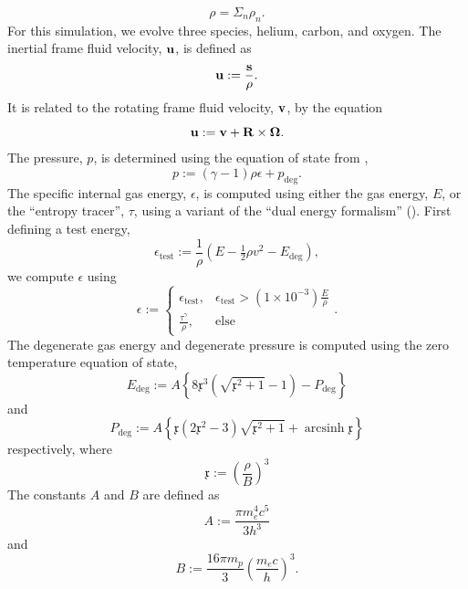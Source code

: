 \documentclass[preprint]{aastex}
\DeclareMathOperator{\arcsinh}{arcsinh}
\begin{document}
\begin{equation}
\rho = \Sigma_n \rho_n.
\end{equation} 
For this simulation, we evolve three species, helium, carbon, and oxygen.
The inertial frame
fluid velocity, ${\bf{u}}$, is defined as 
\begin{equation}
{\bf{u}} := \frac{{\bf{s}}}{\rho}.
\end{equation}
It is related to the rotating frame fluid velocity, ${\bf{v}}$, by the equation
\begin{equation}
{\bf{u}} := {\bf{v}} +  {\bf{R}} \times {\bf{\Omega}}.
\end{equation}
The pressure, $p$, is determined using the equation of state from \cite{SCM1997}, 
\begin{equation}
p := \left( \gamma - 1\right) \rho \epsilon + p_{\mathrm{deg}}.
\end{equation}
The specific internal gas energy, $\epsilon$, is computed using either the gas energy, $E$, or the ``entropy tracer'', $\tau$, using a variant of the ``dual energy formalism'' (\cite{BNSO1995}). 
First defining a test energy,
\begin{equation}
\epsilon_\mathrm{test} := \frac{1}{\rho}\left( E - \tfrac{1}{2} \rho v^2 - E_\mathrm{deg}  \right), 
\end{equation}
we compute $\epsilon$ using
\begin{equation}
\epsilon :=
\begin{cases}
      \epsilon_\mathrm{test}, & \epsilon_\mathrm{test} > \left ( 1 \times 10^{-3} \right ) \frac{E}{\rho} \\
      \frac{\tau^\gamma}{\rho}, & \text{else}
    \end{cases}.
\end{equation}
The degenerate gas energy and degenerate pressure is computed using the zero temperature equation of state, 
\begin{equation}
E_\mathrm{deg} := A \left \{ 
8 \mathfrak{x}^3 \left ( \sqrt{\mathfrak{x}^2 + 1} - 1 \right )  - P_\mathrm{deg} \right \}
\end{equation}
and
\begin{equation}
P_\mathrm{deg} := A \left \{ 
\mathfrak{x} \left ( 2 \mathfrak{x}^2 - 3 \right ) \sqrt{\mathfrak{x}^2 + 1} + \arcsinh{\mathfrak{x}} \right \}
\end{equation}
respectively, where 
\begin{equation}
\mathfrak{x} := \left( \frac{\rho}{B} \right)^3
\end{equation}
The constants $A$ and $B$ are defined as 
\begin{equation}
A := \frac{\pi m_e^4 c^5}{ 3 h^3 }
\end{equation}
and
\begin{equation}
B := \frac{16 \pi m_p}{ 3 } \left(\frac{m_e c}{ h } \right)^3.
\end{equation}
 
\end{document}
